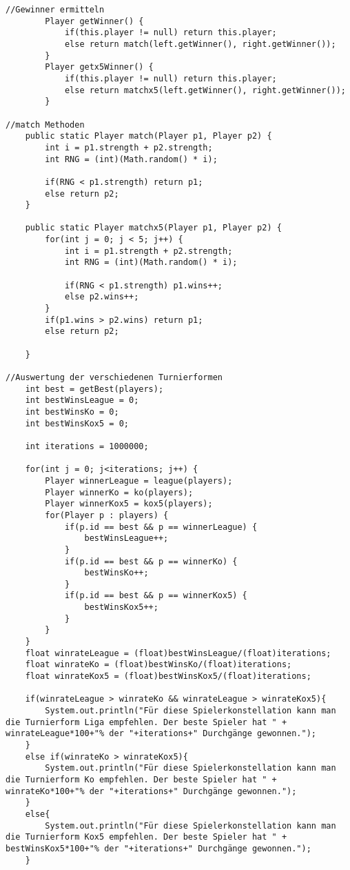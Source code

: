 \documentclass[a4paper, 12pt]{scrartcl}
\begin{document}
\begin{lstlisting}[H]
    //Gewinner ermitteln
        Player getWinner() {
            if(this.player != null) return this.player;
            else return match(left.getWinner(), right.getWinner());
        }
        Player getx5Winner() {
            if(this.player != null) return this.player;
            else return matchx5(left.getWinner(), right.getWinner());
        }

//match Methoden
    public static Player match(Player p1, Player p2) {
        int i = p1.strength + p2.strength;
        int RNG = (int)(Math.random() * i);
        
        if(RNG < p1.strength) return p1;
        else return p2;
    }

    public static Player matchx5(Player p1, Player p2) {
        for(int j = 0; j < 5; j++) {
            int i = p1.strength + p2.strength;
            int RNG = (int)(Math.random() * i);
            
            if(RNG < p1.strength) p1.wins++;
            else p2.wins++;
        }
        if(p1.wins > p2.wins) return p1;
        else return p2;
        
    }

//Auswertung der verschiedenen Turnierformen
    int best = getBest(players);
    int bestWinsLeague = 0;
    int bestWinsKo = 0;
    int bestWinsKox5 = 0;
    
    int iterations = 1000000;
    
    for(int j = 0; j<iterations; j++) {
        Player winnerLeague = league(players);
        Player winnerKo = ko(players);
        Player winnerKox5 = kox5(players);
        for(Player p : players) {
            if(p.id == best && p == winnerLeague) {
                bestWinsLeague++;
            }
            if(p.id == best && p == winnerKo) {
                bestWinsKo++;
            }
            if(p.id == best && p == winnerKox5) {
                bestWinsKox5++;
            }
        }
    }
    float winrateLeague = (float)bestWinsLeague/(float)iterations;
    float winrateKo = (float)bestWinsKo/(float)iterations;
    float winrateKox5 = (float)bestWinsKox5/(float)iterations;

    if(winrateLeague > winrateKo && winrateLeague > winrateKox5){
        System.out.println("Für diese Spielerkonstellation kann man die Turnierform Liga empfehlen. Der beste Spieler hat " + winrateLeague*100+"% der "+iterations+" Durchgänge gewonnen.");
    }
    else if(winrateKo > winrateKox5){
        System.out.println("Für diese Spielerkonstellation kann man die Turnierform Ko empfehlen. Der beste Spieler hat " + winrateKo*100+"% der "+iterations+" Durchgänge gewonnen.");
    }
    else{
        System.out.println("Für diese Spielerkonstellation kann man die Turnierform Kox5 empfehlen. Der beste Spieler hat " + bestWinsKox5*100+"% der "+iterations+" Durchgänge gewonnen.");
    }

\end{lstlisting}
\end{document}
